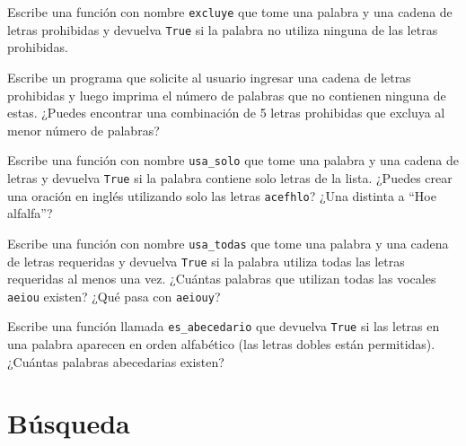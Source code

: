 \documentclass[10pt]{book}
\begin{document}
\begin{exercise}

Escribe una función con nombre {\tt excluye}
que tome una palabra y una cadena de letras prohibidas y
devuelva {\tt True} si la palabra no utiliza ninguna de las letras
prohibidas.

Escribe un programa que solicite al usuario ingresar una cadena
de letras prohibidas y luego imprima el número de palabras que
no contienen ninguna de estas.
¿Puedes encontrar una combinación de 5 letras prohibidas que
excluya al menor número de palabras?

\end{exercise}



\begin{exercise}

Escribe una función con nombre \verb"usa_solo" que tome una palabra y una
cadena de letras y devuelva {\tt True} si la palabra contiene
solo letras de la lista.  ¿Puedes crear una oración en inglés utilizando solo las
letras {\tt acefhlo}?  ¿Una distinta a ``Hoe alfalfa''?

\end{exercise}


\begin{exercise}

Escribe una función con nombre \verb"usa_todas" que tome una palabra y una
cadena de letras requeridas y devuelva {\tt True} si la palabra
utiliza todas las letras requeridas al menos una vez.  ¿Cuántas palabras
que utilizan todas las vocales {\tt aeiou} existen?  ¿Qué pasa con {\tt aeiouy}?

\end{exercise}


\begin{exercise}

Escribe una función llamada \verb"es_abecedario" que devuelva
{\tt True} si las letras en una palabra aparecen en orden alfabético
(las letras dobles están permitidas).
¿Cuántas palabras abecedarias existen?


\end{exercise}



\section{Búsqueda}
\label{search}
\end{document}
